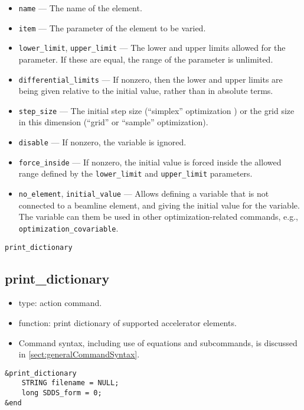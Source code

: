 \documentclass[11pt]{article}
\begin{document}
\begin{itemize}
\item \verb|name| --- The name of the element.
\item \verb|item| --- The parameter of the element to be varied.
\item \verb|lower_limit|, \verb|upper_limit| --- The lower and upper limits allowed for the parameter.  If these are
equal, the range of the parameter is unlimited.
\item \verb|differential_limits| --- If nonzero, then the lower and upper limits are being given relative to the initial value,
  rather than in absolute terms.
\item \verb|step_size| --- The initial step size (``simplex'' optimization ) or the grid size in this dimension (``grid'' or ``sample'' optimization).
\item \verb|disable| --- If nonzero, the variable is ignored.
\item \verb|force_inside| --- If nonzero, the initial value is forced inside the allowed range defined by the \verb|lower_limit| and \verb|upper_limit| parameters.
\item \verb|no_element|, \verb|initial_value|  --- Allows defining a variable that is not connected to a beamline element, and giving
  the initial value for the variable. The variable can them be used in other optimization-related commands, e.g., 
  \verb|optimization_covariable|.
\end{itemize}

\newpage
\begin{center}{\Large\verb|print_dictionary|}\end{center}
\subsection{print\_dictionary \label{subsec:printdictionary}}

\begin{itemize}
\item type: action command.
\item function: print dictionary of supported accelerator elements.
\item Command syntax, including use of equations and subcommands, is discussed in \ref{sect:generalCommandSyntax}.
\end{itemize}

\begin{verbatim}
&print_dictionary
    STRING filename = NULL;
    long SDDS_form = 0;
&end
\end{verbatim}
\end{document}
